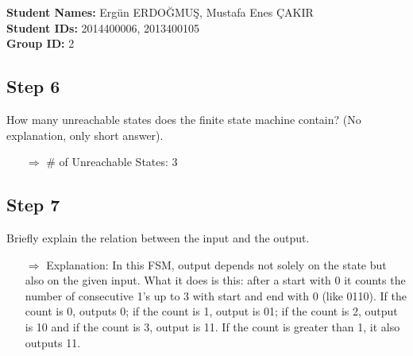 \documentclass[12pt,a4paper]{report}
\begin{document}
\pagebreak
\noindent
\textbf{Student Names:} Ergün ERDOĞMUŞ, Mustafa Enes ÇAKIR \\
\textbf{Student IDs:} 2014400006, 2013400105 \\
\textbf{Group ID:} 2

\subsection*{Step 6}
How many unreachable states does the finite state machine contain? (No explanation, only short answer).
\begin{itemize}
	\item[$\Rightarrow$] \# of Unreachable States: 3
\end{itemize}

\subsection*{Step 7}

Briefly explain the relation between the input and the output.

\begin{itemize}
	\item[$\Rightarrow$] Explanation: In this FSM, output depends not solely on the state but also on the given input. What it does is this: after a start with 0 it counts the number of consecutive 1's up to 3 with start and end with 0 (like 0110). If the count is 0, outputs 0; if the count is 1, output is 01; if the count is 2, output is 10 and if the count is 3, output is 11. If the count is greater than 1, it also outputs 11.
\end{itemize}
\end{document}

